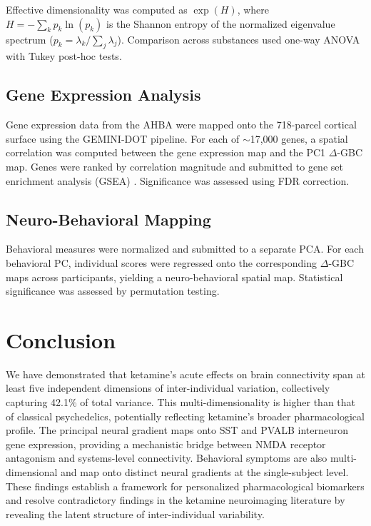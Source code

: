 \documentclass[11pt]{article}
\begin{document}
Effective dimensionality was computed as $\exp(H)$, where $H = -\sum_k p_k \ln(p_k)$ is the Shannon entropy of the normalized eigenvalue spectrum ($p_k = \lambda_k / \sum_j \lambda_j$). Comparison across substances used one-way ANOVA with Tukey post-hoc tests.

\subsection{Gene Expression Analysis}

Gene expression data from the AHBA \citep{hawrylycz2012} were mapped onto the 718-parcel cortical surface using the GEMINI-DOT pipeline. For each of $\sim$17,000 genes, a spatial correlation was computed between the gene expression map and the PC1 $\Delta$-GBC map. Genes were ranked by correlation magnitude and submitted to gene set enrichment analysis (GSEA) \citep{subramanian2005}. Significance was assessed using FDR correction.

\subsection{Neuro-Behavioral Mapping}

Behavioral measures were normalized and submitted to a separate PCA. For each behavioral PC, individual scores were regressed onto the corresponding $\Delta$-GBC maps across participants, yielding a neuro-behavioral spatial map. Statistical significance was assessed by permutation testing.

\section{Conclusion}

We have demonstrated that ketamine's acute effects on brain connectivity span at least five independent dimensions of inter-individual variation, collectively capturing 42.1\% of total variance. This multi-dimensionality is higher than that of classical psychedelics, potentially reflecting ketamine's broader pharmacological profile. The principal neural gradient maps onto SST and PVALB interneuron gene expression, providing a mechanistic bridge between NMDA receptor antagonism and systems-level connectivity. Behavioral symptoms are also multi-dimensional and map onto distinct neural gradients at the single-subject level. These findings establish a framework for personalized pharmacological biomarkers and resolve contradictory findings in the ketamine neuroimaging literature by revealing the latent structure of inter-individual variability.


\end{document}
